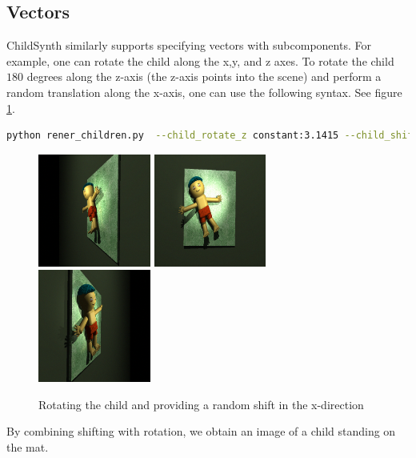 \documentclass{article}
\begin{document}
\subsection{Vectors}

ChildSynth similarly supports specifying vectors with subcomponents. For example, one can rotate the child along the x,y, and z axes. To rotate the child $180$ degrees along the z-axis (the z-axis points into the scene) and perform a random translation along the x-axis, one can use the following syntax. See figure \ref{fig:rotation}.


\begin{lstlisting}[language=bash]
python rener_children.py  --child_rotate_z constant:3.1415 --child_shift_x unif:-1.0,1.0\end{lstlisting}

\begin{figure}[htbp]
    \centering
    \includegraphics[height=3.7cm]{plots/child_000000_rgb_030a.png}
    \includegraphics[height=3.7cm]{plots/child_000000_rgb_090a.png}
    \includegraphics[height=3.7cm]{plots/child_000000_rgb_150a.png}
    \caption{Rotating the child and providing a random shift in the x-direction}
    \label{fig:rotation}
\end{figure}

By combining shifting with rotation, we obtain an image of a child standing on the mat.
\end{document}
